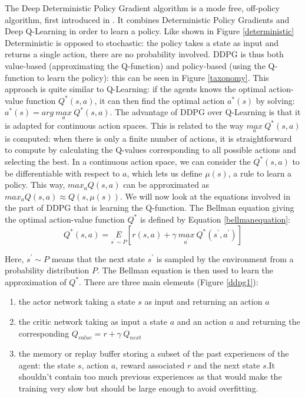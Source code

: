 The Deep Deterministic Policy Gradient algorithm is a mode free, off-policy algorithm, first introduced in \cite{ddpg2015}. It combines Deterministic Policy Gradients and Deep Q-Learning in order to learn a policy. Like shown in Figure \ref{deterministic} Deterministic is opposed to stochastic: the policy takes a state as input and returns a single action, there are no probability involved. \newline
DDPG is thus both value-based (approximating the Q-function) and policy-based (using the Q-function to learn the policy): this can be seen in Figure \ref{taxonomy}. This approach is quite similar to Q-Learning: if the agents knows the optimal action-value function $Q^{*}(s,a)$, it can then find the optimal action $a^{*}(s)$ by solving: $a^{*}(s) = arg \: \underset{a}{max} \: Q^{*}(s,a)$.
The advantage of DDPG over Q-Learning is that it is adapted for continuous action spaces. This is related to the way $\underset{a}{max} \: Q^{*}(s,a)$ is computed: when there is only a finite number of actions, it is straightforward to compute by calculating the Q-values corresponding to all possible actions and selecting the best. In a continuous action space, we can consider the $Q^{*}(s,a)$ to be differentiable with respect to $a$, which lets us define $\mu(s)$, a rule to learn a policy. This way, $max_{a}Q(s,a)$ can be approximated as $max_{a}Q(s,a) \approx Q(s,\mu(s))$. \newline
We will now look at the equations involved in the part of DDPG that is learning the Q-function. The Bellman equation giving the optimal action-value function $Q^{*}$ is defined by Equation \ref{bellmanequation}:
\begin{equation}
\label{bellmanequation}
	Q^{*}(s,a) = \underset{s^{'} \sim P}{E}\left[r(s,a)+\gamma \: \underset{a^{'}}{max} \: Q^{*}(s^{'},a^{'})\right]
\end{equation}
		
Here, $ s^{'} \sim P $ means that the next state $ s^{'} $ is sampled by the environment from a probability distribution $P$. The Bellman equation is then used to learn the approximation of $ Q^{*} $.		
There are three main elements (Figure \ref{ddpg1}): 
\begin{enumerate}
	\item the actor network taking a state $s$ as input and returning an action $a$	
	\item the critic network taking as input a state $a$ and an action $a$ and returning the corresponding $Q_{value} = r + \gamma \: Q_{next}$ 
	\item the memory or replay buffer storing a subset of the past experiences of the agent: the state $s$, action $a$, reward associated $r$ and the next state $s$.It shouldn't contain too much previous experiences as that would make the training very slow but should be large enough to avoid overfitting.

\end{enumerate}


